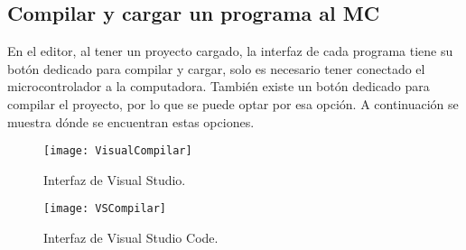 \subsection{Compilar y cargar un programa al MC}
En el editor, al tener un proyecto cargado, la interfaz de cada programa tiene su botón dedicado para compilar y cargar, solo es necesario tener conectado el microcontrolador a la computadora. También existe un botón dedicado para compilar el proyecto, por lo que se puede optar por esa opción. A continuación se muestra dónde se encuentran estas opciones.

\begin{figure}[h]
	\centering
	\texttt{[image: VisualCompilar]}
	\caption{Interfaz de Visual Studio.}
\end{figure}

\begin{figure}[h]
	\centering
	\texttt{[image: VSCompilar]}
	\caption{Interfaz de Visual Studio Code.}
\end{figure}
